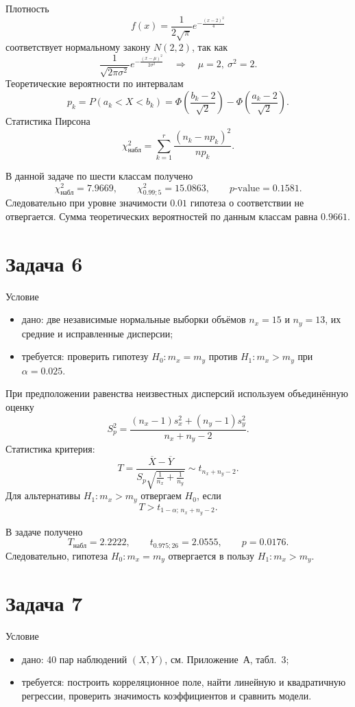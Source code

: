 \documentclass[a4paper,14pt]{extarticle}
\begin{document}
Плотность
\[
f(x)=\frac{1}{2\sqrt{\pi}}e^{-\frac{(x-2)^2}{4}}
\]
соответствует нормальному закону \(N(2,2)\), так как
\[
\frac{1}{\sqrt{2\pi\sigma^2}}e^{-\frac{(x-\mu)^2}{2\sigma^2}}
\quad \Rightarrow \quad
\mu=2,\ \sigma^2=2.
\]
Теоретические вероятности по интервалам
\[
p_k = P(a_k<X<b_k)=\Phi\!\left(\frac{b_k-2}{\sqrt{2}}\right)-\Phi\!\left(\frac{a_k-2}{\sqrt{2}}\right).
\]
Статистика Пирсона
\[
\chi^2_{\text{набл}}=\sum_{k=1}^{r}\frac{(n_k-np_k)^2}{np_k}.
\]

В данной задаче по шести классам получено
\[
\chi^2_{\text{набл}}=7.9669,\qquad
\chi^2_{0.99;5}=15.0863,\qquad
p\text{-value}=0.1581.
\]
Следовательно при уровне значимости \(0.01\) гипотеза о соответствии не отвергается.
Сумма теоретических вероятностей по данным классам равна \(0.9661\).



\section{Задача 6}

Условие
\begin{itemize}
    \item дано: две независимые нормальные выборки объёмов \(n_x=15\) и \(n_y=13\), их средние и исправленные дисперсии;
    \item требуется: проверить гипотезу \(H_0:m_x=m_y\) против \(H_1:m_x>m_y\) при \(\alpha=0.025\).
\end{itemize}

При предположении равенства неизвестных дисперсий используем объединённую оценку
\[
S_p^2=\frac{(n_x-1)s_x^2+(n_y-1)s_y^2}{n_x+n_y-2}.
\]
Статистика критерия:
\[
T=\frac{\overline{X}-\overline{Y}}{S_p\sqrt{\frac{1}{n_x}+\frac{1}{n_y}}}
\sim t_{n_x+n_y-2}.
\]
Для альтернативы \(H_1:m_x>m_y\) отвергаем \(H_0\), если
\[
T>t_{1-\alpha;\,n_x+n_y-2}.
\]

В задаче получено
\[
T_{\text{набл}}=2.2222,\qquad t_{0.975;26}=2.0555,\qquad p=0.0176.
\]
Следовательно, гипотеза \(H_0:m_x=m_y\) отвергается в пользу \(H_1:m_x>m_y\).



\section{Задача 7}

Условие
\begin{itemize}
    \item дано: 40 пар наблюдений \((X,Y)\), см. Приложение~А, табл.~3;
    \item требуется: построить корреляционное поле, найти линейную и квадратичную регрессии, проверить значимость коэффициентов и сравнить модели.
\end{itemize}
\end{document}
